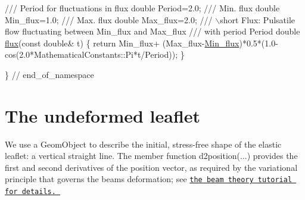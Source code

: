 \begin{DoxyCodeInclude}
\textcolor{comment}{}
\textcolor{comment}{ /// Period for fluctuations in flux}
\textcolor{comment}{} \textcolor{keywordtype}{double} Period=2.0;
\textcolor{comment}{}
\textcolor{comment}{ /// Min. flux}
\textcolor{comment}{} \textcolor{keywordtype}{double} Min\_flux=1.0;
 \textcolor{comment}{}
\textcolor{comment}{ /// Max. flux}
\textcolor{comment}{} \textcolor{keywordtype}{double} Max\_flux=2.0;
 \textcolor{comment}{}
\textcolor{comment}{ /// \(\backslash\)short Flux: Pulsatile flow fluctuating between Min\_flux and Max\_flux }
\textcolor{comment}{ /// with period Period}
\textcolor{comment}{} \textcolor{keywordtype}{double} \hyperlink{namespaceGlobal__Physical__Variables_ad651484fe06209606bccefe6fe23be0c}{flux}(\textcolor{keyword}{const} \textcolor{keywordtype}{double}& t)
 \{  
  \textcolor{keywordflow}{return} Min\_flux+
   (Max\_flux-\hyperlink{namespaceGlobal__Physical__Variables_aa46dc81a0757e8f9707646e03c32d4fc}{Min\_flux})*0.5*(1.0-cos(2.0*MathematicalConstants::Pi*t/Period));
 \}

\} \textcolor{comment}{// end\_of\_namespace}

\end{DoxyCodeInclude}




 

\hypertarget{index_leaflet}{}\section{The undeformed leaflet}\label{index_leaflet}
We use a {\ttfamily Geom\+Object} to describe the initial, stress-\/free shape of the elastic leaflet\+: a vertical straight line. The member function {\ttfamily d2position}(...) provides the first and second derivatives of the position vector, as required by the variational principle that governs the beam\textquotesingle{}s deformation; see \href{../../../beam/tensioned_string/html/index.html}{\tt the beam theory tutorial for details. }



